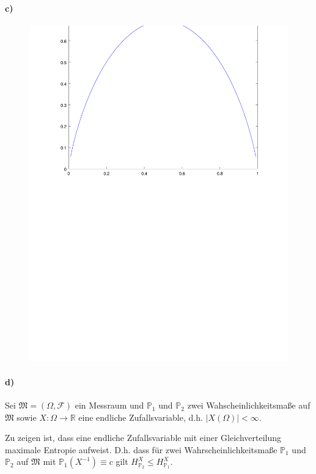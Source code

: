 \documentclass{scrartcl}
\newcommand{\Prob}{\mathbb{P}}
\newcommand{\R}{\mathbb{R}}
\begin{document}
\paragraph{c)}
\begin{figure}
    \centering
    \includegraphics[width=\textwidth]{PlotA2c.pdf}
\end{figure}

\paragraph{d)}
Sei $\mathfrak{M} = (\Omega, \mathcal{F})$ ein Messraum und $\Prob_1$ und $\Prob_2$
zwei Wahscheinlichkeitsmaße auf $\mathfrak{M}$ sowie
$X : \Omega \to \R$ eine endliche Zufallsvariable, d.h.
$\left|X(\Omega)\right| < \infty$.

Zu zeigen ist, dass eine endliche Zufallsvariable mit einer Gleichverteilung
maximale Entropie aufweist. D.h. dass für zwei Wahrscheinlichkeitsmaße $\Prob_1$
und $\Prob_2$ auf $\mathfrak{M}$ mit $\Prob_1(X^{-1}) \equiv c$ gilt
$H_{\Prob_2}^X \le H_{\Prob_1}^X$.
\end{document}
